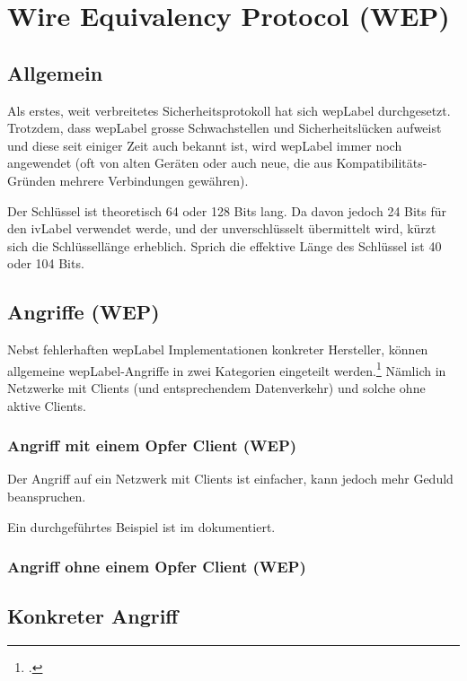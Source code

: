 \chapter{Wire Equivalency Protocol (WEP)}
\label{ch:wep}

\section{Allgemein}
Als erstes, weit verbreitetes Sicherheitsprotokoll hat sich \acrfull{wepLabel} durchgesetzt.
Trotzdem, dass \gls{wepLabel} grosse Schwachstellen und Sicherheitslücken aufweist und diese seit einiger Zeit auch bekannt ist, wird \gls{wepLabel} immer noch angewendet (oft von alten Geräten oder auch neue, die aus Kompatibilitäts-Gründen mehrere Verbindungen gewähren).

Der Schlüssel ist theoretisch 64 oder 128 Bits lang.
Da davon jedoch 24 Bits für den \gls{ivLabel} verwendet werde, und der unverschlüsselt übermittelt wird, kürzt sich die Schlüssellänge erheblich.
Sprich die effektive Länge des Schlüssel ist 40 oder 104 Bits.

\section{Angriffe (WEP)}
Nebst fehlerhaften \gls{wepLabel} Implementationen konkreter Hersteller, können allgemeine \gls{wepLabel}-Angriffe in zwei Kategorien eingeteilt werden.\footcite[][126f.]{WrightCache201503}
Nämlich in Netzwerke mit Clients (und entsprechendem Datenverkehr) und solche ohne aktive Clients.

\subsection{Angriff mit einem Opfer Client (WEP)}
Der Angriff auf ein Netzwerk mit Clients ist einfacher, kann jedoch mehr Geduld beanspruchen.

Ein durchgeführtes Beispiel ist im  dokumentiert.





\subsection{Angriff ohne einem Opfer Client (WEP)}


\section{Konkreter Angriff}
\label{sec:wepAttack}

